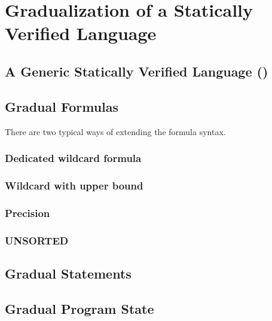 \chapter{Gradualization of a Statically Verified Language}
\label{ch:gradualization-of-a}


\section{A Generic Statically Verified Language (\gsvl)}
\label{sec:a-statically-verified}


\section{Gradual Formulas}
\label{sec:gradual-formulas}


There are two typical ways of extending the formula syntax.
    \subsection{Dedicated wildcard formula}
    \label{ssec:dedicated-wildcard-formula}
    
    
    \subsection{Wildcard with upper bound}
    \label{ssec:wildcard-with-upper}
    

    \subsection{Precision}
    \label{ssec:precision}
    
    
    \subsection{UNSORTED}
    \label{ssec:gfconclusion}
    
    
\section{Gradual Statements}
\label{sec:gradual-statements}


\section{Gradual Program State}
\label{sec:gradual-program-state}

    
